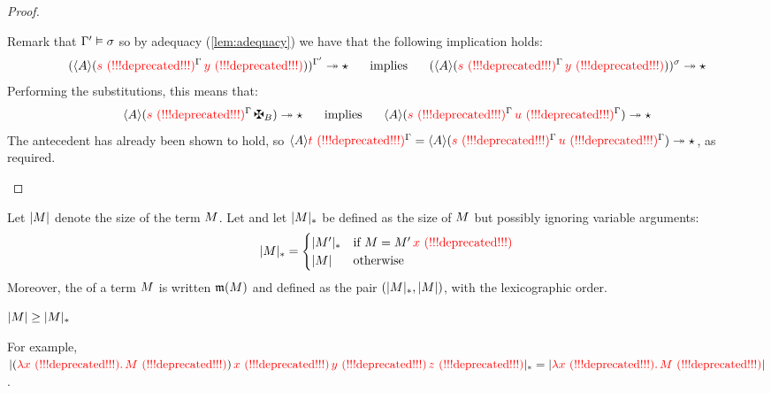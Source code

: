 \begin{proof}
\begin{enumerate}
  Remark that
  $\Gamma'\vDash\sigma$
  so by adequacy (\ref{lem:adequacy})
  we have that the following implication holds:
  \[
    (\langle A\rangle(\textcolor{red}{s \text{\,\,(!!!deprecated!!!)}}^{\Gamma}\,\textcolor{red}{y \text{\,\,(!!!deprecated!!!)}}))^{\Gamma'} \twoheadrightarrow \star
    \hspace{.5cm}\text{ implies }\hspace{.5cm}
    (\langle A\rangle(\textcolor{red}{s \text{\,\,(!!!deprecated!!!)}}^{\Gamma}\,\textcolor{red}{y \text{\,\,(!!!deprecated!!!)}}))^{\sigma} \twoheadrightarrow \star
  \]
  Performing the substitutions, this means that:
  \[
    \verif{\typ}{(\subs{\tmtwo}{\tenv}\,\gen{\typtwo})} \tos \iunit
    \HS\text{ implies }\HS
    \verif{\typ}{(\subs{\tmtwo}{\tenv}\,\subs{\tmthree}{\tenv})} \tos \iunit
  \]
  The antecedent has already been shown to hold,
  so
  $\langle A\rangle\textcolor{red}{t \text{\,\,(!!!deprecated!!!)}}^{\Gamma}
   = \langle A\rangle(\textcolor{red}{s \text{\,\,(!!!deprecated!!!)}}^{\Gamma}\,\textcolor{red}{u \text{\,\,(!!!deprecated!!!)}}^{\Gamma})
   \twoheadrightarrow \star$,
  as required.
\end{enumerate}
\end{proof}

\begin{definition}
Let $\lvert M\rvert$ denote the size of the term $M$.
Let and let $\lvert M\rvert_*$ be defined as the size of $M$
but possibly ignoring variable arguments:
\[
  \lvert M\rvert_* =
    \begin{cases}
      \lvert M'\rvert_* & \text{if $M = M'\,\textcolor{red}{x \text{\,\,(!!!deprecated!!!)}}$} \\
      \lvert M\rvert     & \text{otherwise}
    \end{cases}
\]
Moreover, the  of a term $M$ is written
$\mathfrak{m}(M)$ and defined as the pair $(\lvert M\rvert_*,\lvert M\rvert)$,
with the lexicographic order. 
\end{definition}

\begin{remark}
$\lvert M\rvert \geq \lvert M\rvert_*$
\end{remark}

For example,
$\lvert(\textcolor{red}{\lambda \textcolor{red}{x \text{\,\,(!!!deprecated!!!)}}.\,M \text{\,\,(!!!deprecated!!!)}})\,\textcolor{red}{x \text{\,\,(!!!deprecated!!!)}}\,\textcolor{red}{y \text{\,\,(!!!deprecated!!!)}}\,\textcolor{red}{z \text{\,\,(!!!deprecated!!!)}}\rvert_* = \lvert\textcolor{red}{\lambda \textcolor{red}{x \text{\,\,(!!!deprecated!!!)}}.\,M \text{\,\,(!!!deprecated!!!)}}\rvert$.

